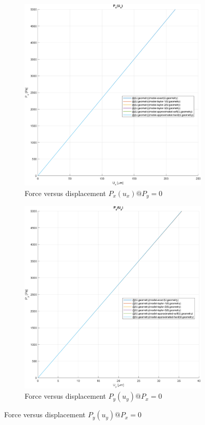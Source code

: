 \begin{figure}[H]
    \centering
    \begin{subfigure}[b]{0.45\textwidth}
        \centering
        \includegraphics[width=.9\textwidth]{img/force_versus_displacement_Px5000}
        \caption{Force versus displacement $P_x(u_x) @ P_y = 0$}
        \label{fig:force_versus_displacement_Px5000}
    \end{subfigure}
    \hfill
    \begin{subfigure}[b]{0.45\textwidth}
        \centering
        \includegraphics[width=.9\textwidth]{img/force_versus_displacement_Py5000}
        \caption{Force versus displacement $P_y(u_y) @ P_x = 0$}
        \label{fig:force_versus_displacement_Py5000}
    \end{subfigure}
    \label{fig:force_versus_displacement_Px5000_Py5000}
\end{figure}


